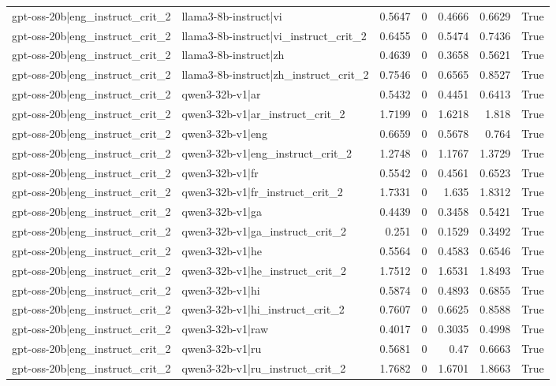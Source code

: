\begin{table}
\begin{tabular}{l l r r r r l}
gpt-oss-20b|eng_instruct_crit_2 & llama3-8b-instruct|vi & 0.5647 & 0 & 0.4666 & 0.6629 & True \\
gpt-oss-20b|eng_instruct_crit_2 & llama3-8b-instruct|vi_instruct_crit_2 & 0.6455 & 0 & 0.5474 & 0.7436 & True \\
gpt-oss-20b|eng_instruct_crit_2 & llama3-8b-instruct|zh & 0.4639 & 0 & 0.3658 & 0.5621 & True \\
gpt-oss-20b|eng_instruct_crit_2 & llama3-8b-instruct|zh_instruct_crit_2 & 0.7546 & 0 & 0.6565 & 0.8527 & True \\
gpt-oss-20b|eng_instruct_crit_2 & qwen3-32b-v1|ar & 0.5432 & 0 & 0.4451 & 0.6413 & True \\
gpt-oss-20b|eng_instruct_crit_2 & qwen3-32b-v1|ar_instruct_crit_2 & 1.7199 & 0 & 1.6218 & 1.818 & True \\
gpt-oss-20b|eng_instruct_crit_2 & qwen3-32b-v1|eng & 0.6659 & 0 & 0.5678 & 0.764 & True \\
gpt-oss-20b|eng_instruct_crit_2 & qwen3-32b-v1|eng_instruct_crit_2 & 1.2748 & 0 & 1.1767 & 1.3729 & True \\
gpt-oss-20b|eng_instruct_crit_2 & qwen3-32b-v1|fr & 0.5542 & 0 & 0.4561 & 0.6523 & True \\
gpt-oss-20b|eng_instruct_crit_2 & qwen3-32b-v1|fr_instruct_crit_2 & 1.7331 & 0 & 1.635 & 1.8312 & True \\
gpt-oss-20b|eng_instruct_crit_2 & qwen3-32b-v1|ga & 0.4439 & 0 & 0.3458 & 0.5421 & True \\
gpt-oss-20b|eng_instruct_crit_2 & qwen3-32b-v1|ga_instruct_crit_2 & 0.251 & 0 & 0.1529 & 0.3492 & True \\
gpt-oss-20b|eng_instruct_crit_2 & qwen3-32b-v1|he & 0.5564 & 0 & 0.4583 & 0.6546 & True \\
gpt-oss-20b|eng_instruct_crit_2 & qwen3-32b-v1|he_instruct_crit_2 & 1.7512 & 0 & 1.6531 & 1.8493 & True \\
gpt-oss-20b|eng_instruct_crit_2 & qwen3-32b-v1|hi & 0.5874 & 0 & 0.4893 & 0.6855 & True \\
gpt-oss-20b|eng_instruct_crit_2 & qwen3-32b-v1|hi_instruct_crit_2 & 0.7607 & 0 & 0.6625 & 0.8588 & True \\
gpt-oss-20b|eng_instruct_crit_2 & qwen3-32b-v1|raw & 0.4017 & 0 & 0.3035 & 0.4998 & True \\
gpt-oss-20b|eng_instruct_crit_2 & qwen3-32b-v1|ru & 0.5681 & 0 & 0.47 & 0.6663 & True \\
gpt-oss-20b|eng_instruct_crit_2 & qwen3-32b-v1|ru_instruct_crit_2 & 1.7682 & 0 & 1.6701 & 1.8663 & True \\

\end{tabular}
\end{table}

